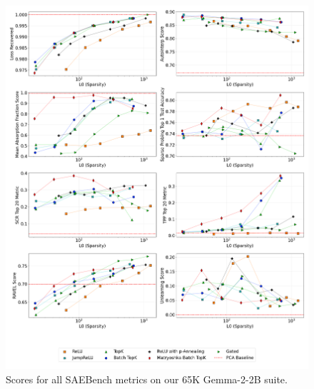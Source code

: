 \documentclass{article}
\theoremstyle{plain}
\theoremstyle{definition}
\theoremstyle{remark}
\begin{document}
\begin{figure}[h!]
    \centering
    \includegraphics[width=\columnwidth]{images/plot_2x4_sae_bench_gemma-2-2b_65k_architecture_series_layer_12.png}
    \caption{Scores for all SAEBench metrics on our 65K Gemma-2-2B suite.}
\end{figure}
\label{fig:plot_2x4_sae_bench_gemma-2-2b_65k_architecture_series_layer_12}
\end{document}
